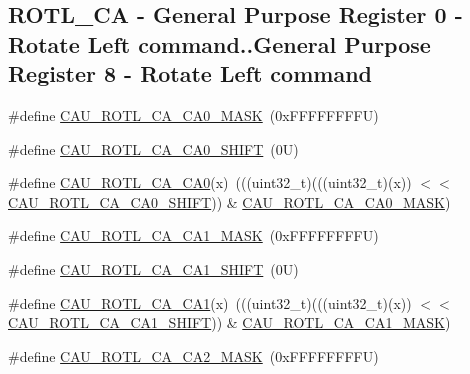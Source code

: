 \subsection*{R\+O\+T\+L\+\_\+\+CA -\/ General Purpose Register 0 -\/ Rotate Left command..General Purpose Register 8 -\/ Rotate Left command}
\begin{DoxyCompactItemize}
\item 
\#define \mbox{\hyperlink{group___c_a_u___register___masks_ga2b86bab9480c6bf6115dad260ab161a3}{C\+A\+U\+\_\+\+R\+O\+T\+L\+\_\+\+C\+A\+\_\+\+C\+A0\+\_\+\+M\+A\+SK}}~(0x\+F\+F\+F\+F\+F\+F\+F\+F\+U)
\item 
\#define \mbox{\hyperlink{group___c_a_u___register___masks_ga3181be32a342d2194fc201a642c18878}{C\+A\+U\+\_\+\+R\+O\+T\+L\+\_\+\+C\+A\+\_\+\+C\+A0\+\_\+\+S\+H\+I\+FT}}~(0\+U)
\item 
\#define \mbox{\hyperlink{group___c_a_u___register___masks_ga75587dbec3309dd33c787776321096eb}{C\+A\+U\+\_\+\+R\+O\+T\+L\+\_\+\+C\+A\+\_\+\+C\+A0}}(x)~(((uint32\+\_\+t)(((uint32\+\_\+t)(x)) $<$$<$ \mbox{\hyperlink{group___c_a_u___register___masks_ga3181be32a342d2194fc201a642c18878}{C\+A\+U\+\_\+\+R\+O\+T\+L\+\_\+\+C\+A\+\_\+\+C\+A0\+\_\+\+S\+H\+I\+FT}})) \& \mbox{\hyperlink{group___c_a_u___register___masks_ga2b86bab9480c6bf6115dad260ab161a3}{C\+A\+U\+\_\+\+R\+O\+T\+L\+\_\+\+C\+A\+\_\+\+C\+A0\+\_\+\+M\+A\+SK}})
\item 
\#define \mbox{\hyperlink{group___c_a_u___register___masks_gabfb4747ca51ec2bf523adf1d27b3a55c}{C\+A\+U\+\_\+\+R\+O\+T\+L\+\_\+\+C\+A\+\_\+\+C\+A1\+\_\+\+M\+A\+SK}}~(0x\+F\+F\+F\+F\+F\+F\+F\+F\+U)
\item 
\#define \mbox{\hyperlink{group___c_a_u___register___masks_ga7a9ebabc5cddc8cb1d94f2b371b614d2}{C\+A\+U\+\_\+\+R\+O\+T\+L\+\_\+\+C\+A\+\_\+\+C\+A1\+\_\+\+S\+H\+I\+FT}}~(0\+U)
\item 
\#define \mbox{\hyperlink{group___c_a_u___register___masks_gacb972ecc560e0270bf5f6f02fc7e8eda}{C\+A\+U\+\_\+\+R\+O\+T\+L\+\_\+\+C\+A\+\_\+\+C\+A1}}(x)~(((uint32\+\_\+t)(((uint32\+\_\+t)(x)) $<$$<$ \mbox{\hyperlink{group___c_a_u___register___masks_ga7a9ebabc5cddc8cb1d94f2b371b614d2}{C\+A\+U\+\_\+\+R\+O\+T\+L\+\_\+\+C\+A\+\_\+\+C\+A1\+\_\+\+S\+H\+I\+FT}})) \& \mbox{\hyperlink{group___c_a_u___register___masks_gabfb4747ca51ec2bf523adf1d27b3a55c}{C\+A\+U\+\_\+\+R\+O\+T\+L\+\_\+\+C\+A\+\_\+\+C\+A1\+\_\+\+M\+A\+SK}})
\item 
\#define \mbox{\hyperlink{group___c_a_u___register___masks_ga747bae472035b772b9099ece284b7520}{C\+A\+U\+\_\+\+R\+O\+T\+L\+\_\+\+C\+A\+\_\+\+C\+A2\+\_\+\+M\+A\+SK}}~(0x\+F\+F\+F\+F\+F\+F\+F\+F\+U)

\end{DoxyCompactItemize}
